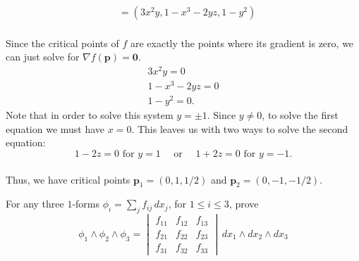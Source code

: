 \documentclass[12 pt, letterpaper]{hmcpset}
\begin{document}
\begin{solution}
\begin{enumerate}
\[\begin{split}
							    & = (3 x^2 y, 1 - x^3 - 2y z, 1 - y^2)
				\end{split}
			\] \\
			Since the critical points of $f$ are exactly the points where its gradient is zero, we can just solve for $\nabla f(\mathbf p) = \mathbf 0$.
			\[
				\begin{gathered}
					3 x^2 y = 0 \\
					1 - x^3 - 2y z = 0 \\
					1 - y^2 = 0.
				\end{gathered}
			\]
			Note that in order to solve this system $y = \pm 1$. Since $y \neq 0$, to solve the first equation we must have $x = 0$. This leaves us with two ways to solve the second equation:
			\[
				1 - 2z = 0 \text{ for } y = 1 \quad \text{ or } \quad 1 + 2z = 0 \text{ for } y = - 1.
			\] \\
			Thus, we have critical points $\mathbf p_1 = (0, 1, 1/2)$ and $\mathbf p_2 = (0, -1, -1/2)$.
	\end{enumerate}
\end{solution}

\pagebreak

\begin{problem}[Problem 4]
	For any three $1$-forms $\phi_i = \sum_j f_{ij} \, dx_j$, for $1 \le i \le 3$, prove
	\[
		\phi_1 \wedge \phi_2 \wedge \phi_3 = \begin{vmatrix}
			f_{11} & f_{12} & f_{13} \\
			f_{21} & f_{22} & f_{23} \\
			f_{31} & f_{32} & f_{33}
		\end{vmatrix} \, dx_1 \wedge dx_2 \wedge dx_3
	\]
\end{problem}
\end{document}
